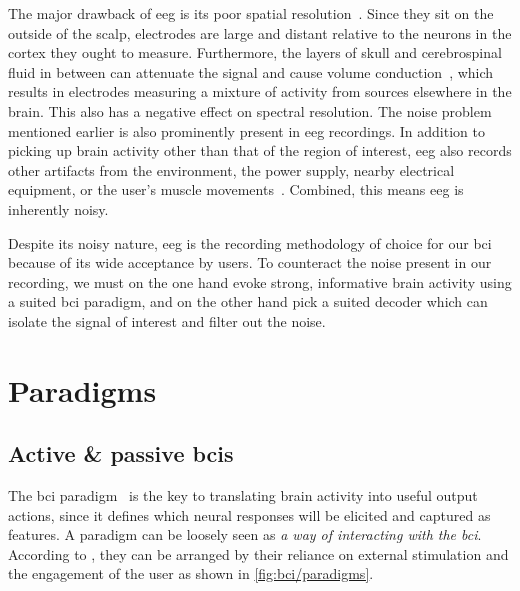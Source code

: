 The major drawback of \ac{eeg} is its poor spatial resolution~\cite{Ferree2001}.
Since they sit on the outside of the scalp, electrodes are large and distant relative to
the neurons in the cortex they ought to measure.
Furthermore, the layers of skull and cerebrospinal fluid in between can attenuate the
signal and cause volume conduction~\cite{Broek1998}, which results in electrodes
measuring a mixture of activity from sources elsewhere in the brain.
This also has a negative effect on spectral resolution.
The noise problem mentioned earlier is also prominently present in \ac{eeg} recordings.
In addition to picking up brain activity other than that of the region of interest,
\ac{eeg} also records other artifacts from the environment, the power supply, nearby
electrical equipment, or the user's muscle movements~\cite{Urigueen2015}.
Combined, this means \ac{eeg} is inherently noisy.

Despite its noisy nature, \ac{eeg} is the recording methodology of choice for our
\ac{bci} because of its wide acceptance by users.
To counteract the noise present in our recording, we must on the one hand evoke strong,
informative brain activity using a suited \ac{bci} paradigm, and on the other hand pick
a suited decoder which can isolate the signal of interest and filter out the noise.


\section{Paradigms}
\label{sec:bci/paradigms}

\subsection{Active \& passive \acsp{bci}}

The \ac{bci} paradigm~\cite{Xu2021,Neeling2019} is the key to translating brain activity
into useful output actions, since it defines which neural responses will be elicited and
captured as features.
A paradigm can be loosely seen as \emph{a way of interacting with the \ac{bci}}.
According to \textcite{Zander2011}, they can be arranged by their reliance on external
stimulation and the engagement of the user as shown in \cref{fig:bci/paradigms}.


